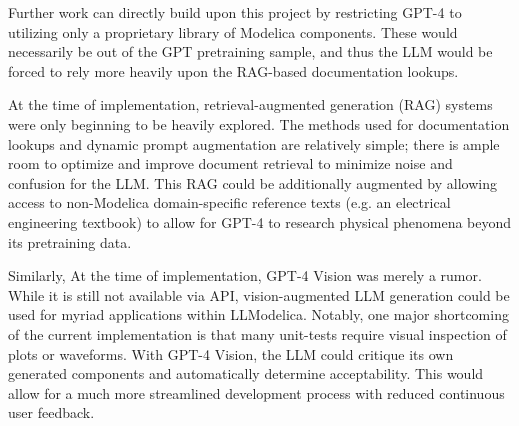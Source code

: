 \documentclass[11pt]{article}
\begin{document}
Further work can directly build upon this project by restricting GPT-4 to utilizing only a proprietary library of Modelica components. These would necessarily be out of the GPT pretraining sample, and thus the LLM would be forced to rely more heavily upon the RAG-based documentation lookups.

At the time of implementation, retrieval-augmented generation (RAG) systems were only beginning to be heavily explored. The methods used for documentation lookups and dynamic prompt augmentation are relatively simple; there is ample room to optimize and improve document retrieval to minimize noise and confusion for the LLM. This RAG could be additionally augmented by allowing access to non-Modelica domain-specific reference texts (e.g. an electrical engineering textbook) to allow for GPT-4 to research physical phenomena beyond its pretraining data.

Similarly, At the time of implementation, GPT-4 Vision was merely a rumor. While it is still not available via API, vision-augmented LLM generation could be used for myriad applications within LLModelica. Notably, one major shortcoming of the current implementation is that many unit-tests require visual inspection of plots or waveforms. With GPT-4 Vision, the LLM could critique its own generated components and automatically determine acceptability. This would allow for a much more streamlined development process with reduced continuous user feedback.
\end{document}
